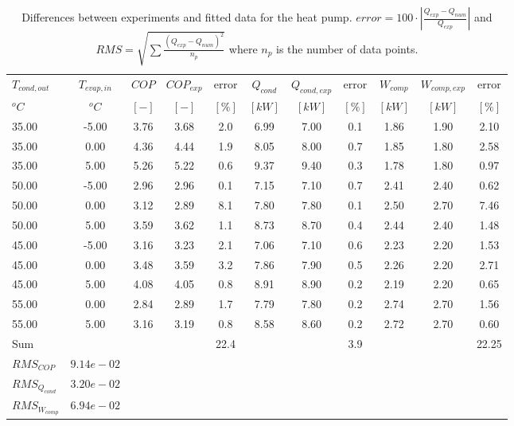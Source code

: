 \documentclass[english]{SPFShortReport}
\begin{document}
\begin{table}[!ht]
\begin{small}
\caption{Differences between experiments and fitted data for the heat pump.          $error=100 \cdot |\frac{Q_{exp}-Q_{num}}{Q_{exp}}|$ and $RMS = \sqrt { \sum{\frac{(Q_{exp}-Q_{num})^2}{n_p}} }$ where $n_p$ is the number of data points.}
\begin{center}
\resizebox{12cm}{!} 
{
\begin{tabular}{l | c c c c c c c c c c } 
\hline
\hline
$T_{cond,out}$ &$T_{evap,in}$ &$COP$ &$COP_{exp}$ &error &$Q_{cond}$ &$Q_{cond,exp}$ &error &$W_{comp}$ &$W_{comp,exp}$ &error \\ 
$^oC$ &$^oC$ &$[-]$ &$[-]$ &$[\%]$ &$[kW]$ &$[kW]$ &$[\%]$ &$[kW]$ &$[kW]$ &$[\%]$\\ 
\hline
35.00  & -5.00 & 3.76 & 3.68 & 2.0 & 6.99 & 7.00 & 0.1 & 1.86 & 1.90 & 2.10\\ 
35.00  & 0.00 & 4.36 & 4.44 & 1.9 & 8.05 & 8.00 & 0.7 & 1.85 & 1.80 & 2.58\\ 
35.00  & 5.00 & 5.26 & 5.22 & 0.6 & 9.37 & 9.40 & 0.3 & 1.78 & 1.80 & 0.97\\ 
50.00  & -5.00 & 2.96 & 2.96 & 0.1 & 7.15 & 7.10 & 0.7 & 2.41 & 2.40 & 0.62\\ 
50.00  & 0.00 & 3.12 & 2.89 & 8.1 & 7.80 & 7.80 & 0.1 & 2.50 & 2.70 & 7.46\\ 
50.00  & 5.00 & 3.59 & 3.62 & 1.1 & 8.73 & 8.70 & 0.4 & 2.44 & 2.40 & 1.48\\ 
45.00  & -5.00 & 3.16 & 3.23 & 2.1 & 7.06 & 7.10 & 0.6 & 2.23 & 2.20 & 1.53\\ 
45.00  & 0.00 & 3.48 & 3.59 & 3.2 & 7.86 & 7.90 & 0.5 & 2.26 & 2.20 & 2.71\\ 
45.00  & 5.00 & 4.08 & 4.05 & 0.8 & 8.91 & 8.90 & 0.2 & 2.19 & 2.20 & 0.65\\ 
55.00  & 0.00 & 2.84 & 2.89 & 1.7 & 7.79 & 7.80 & 0.2 & 2.74 & 2.70 & 1.56\\ 
55.00  & 5.00 & 3.16 & 3.19 & 0.8 & 8.58 & 8.60 & 0.2 & 2.72 & 2.70 & 0.60\\ 
\hline 
 Sum &  & &  & 22.4 &  &  & 3.9 & &  & 22.25\\ 
\hline 
 $RMS_{COP}$ & $9.14e-02$ \\ 
 $RMS_{Q_{cond}}$ & $3.20e-02$ \\ 
 $RMS_{W_{comp}}$ & $6.94e-02$ \\ 
\hline
\hline
\end{tabular}
}
\label{ErrorsTable}
\end{center}
\end{small}
\end{table}
\end{document}
